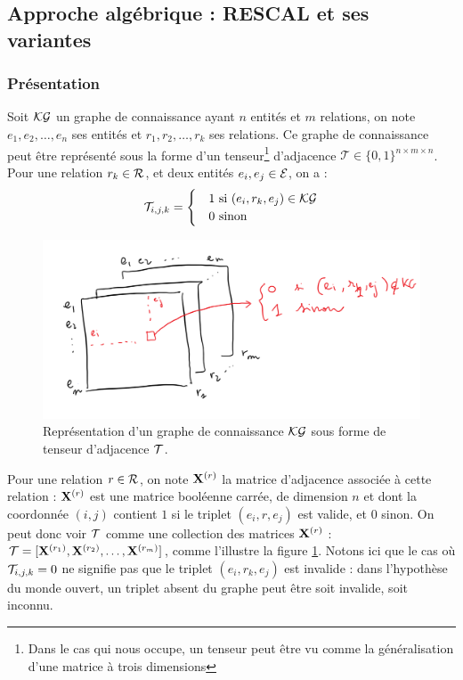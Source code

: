\subsection{Approche algébrique : RESCAL et ses variantes}
\label{subsec:kge-models-mult}

\subsubsection{Présentation}


Soit $\KG$ un graphe de connaissance ayant $n$ entités et $m$ relations, on note $e_1, e_2, \ldots, e_n$ ses entités et $r_1, r_2, \ldots, r_k$ ses relations. Ce graphe de connaissance peut être représenté sous la forme d'un tenseur\footnote{Dans le cas qui nous occupe, un tenseur peut être vu comme la généralisation d'une matrice à trois dimensions} d'adjacence $\mathcal{T} \in \{0, 1\}^{n \times m \times n}$. Pour une relation $r_k \in \Rel$, et deux entités $e_i, e_j \in \Ent$, on a :
\begin{equation}
    \cal{T}_{i, j, k} = \begin{cases}
    &1 \text{ si } (e_i, r_k, e_j) \in \KG \\
    &0 \text{ sinon}
    \end{cases}
\end{equation}

\begin{figure}
    \centering
    \includegraphics[width=\textwidth]{img/tenseur_adjacence.png}
    \caption[Représentation de graphe sous forme de tenseur d'adjacence]{Représentation d'un graphe de connaissance $\KG$ sous forme de tenseur d'adjacence $\cal{T}$.}
    \label{fig:kge-algebric-overview}
\end{figure}

Pour une relation $r \in \Rel$, on note $\bf{X}^{(r)}$ la matrice d'adjacence associée à cette relation : $\bf{X}^{(r)}$ est une matrice booléenne carrée, de dimension $n$ et dont la coordonnée $(i, j)$ contient $1$ si le triplet $(e_i, r, e_j)$ est valide, et $0$ sinon. On peut donc voir $\cal{T}$ comme une collection des matrices $\bf{X}^{(r)}$ : $\cal{T} = [\bf{X}^{(r_1)}, \bf{X}^{(r_2)}, \ldots, \bf{X}^{(r_m)}]$, comme l'illustre la figure  \ref{fig:kge-algebric-overview}. Notons ici que le cas où $\cal{T}_{i, j, k} = 0$ ne signifie pas que le triplet $(e_i, r_k, e_j)$ est invalide : dans l'hypothèse du monde ouvert, un triplet absent du graphe peut être soit invalide, soit inconnu.

